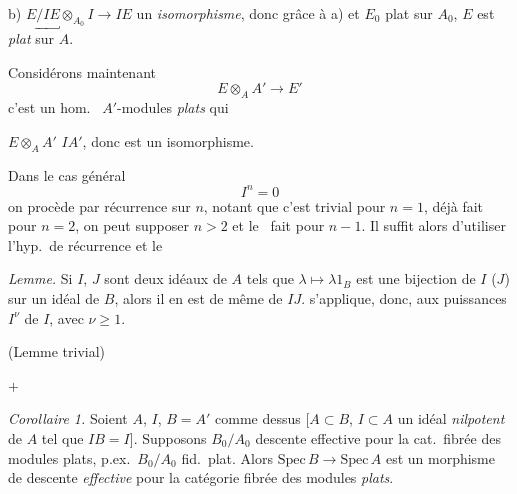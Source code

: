 \documentclass[11pt,a4paper]{article}
\begin{document}
b) $\underbracket{E/IE} \otimes_{A_0} I \to IE$ un \emph{isomorphisme},
donc grâce à a) et $E_0$ plat sur $A_0$, $E$ est \emph{plat} sur $A$.

Considérons maintenant  
\[
  E \otimes_A A' \to E'
\]
c'est un hom.\ \ill{}  $A'$-modules \emph{plats} qui


\ill{} \ill{} \ill{} \ill{} \ill{} \ill{} \ill{} \ill{} $E \otimes_A A'$
\ill{} \ill{} $IA'$, donc est un isomorphisme.


Dans le cas général
\[
  I^n = 0
\]
on procède par récurrence sur $n$,  notant que c'est
trivial pour $n = 1$, déjà fait pour $n = 2$, on peut supposer $n > 2$ et
le \ fait pour $n - 1$.  Il suffit alors
d'utiliser l'hyp.\ de récurrence et le

\emph{Lemme.} Si $I$, $J$ sont deux idéaux de $A$ tels que
$\lambda \mapsto \lambda 1_B$ est une bijection de $I$ ($J$) sur un idéal
de $B$, alors il en est de même de $IJ$.  s'applique,
donc, aux puissances $I^{\nu}$ de $I$, avec $\nu \geqslant 1$.

(Lemme trivial)

$+$

\emph{Corollaire 1.} Soient $A$, $I$, $B = A'$ comme dessus
[$A \subset B$, $I \subset A$ un idéal \emph{nilpotent} de $A$ tel que
$IB = I$].  Supposons $B_0/A_0$ 
 descente effective pour la cat.\ fibrée des modules
plats, p.ex.\ $B_0/A_0$ fid.\ plat. Alors
$\mathrm{Spec}\, B \to \mathrm{Spec}\, A$ est un morphisme de descente
\emph{effective} pour la catégorie fibrée des modules \emph{plats}.
\end{document}
